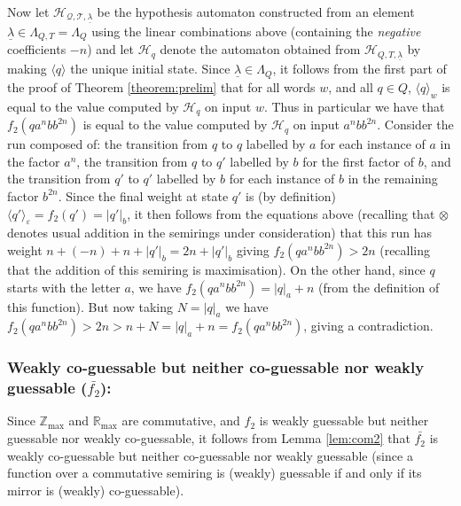 \documentclass[10pt,a4paper]{amsart}
\theoremstyle{definition}
\numberwithin{equation}{section}
\numberwithin{theorem}{section}
\begin{document}
         Now let $\mathcal{H_{Q,T, \underline{\lambda}}}$ be the hypothesis automaton constructed from an element $\underline{\lambda} \in \Lambda_{Q, T} = \Lambda_Q$ using the linear combinations above (containing the \emph{negative} coefficients $-n$) and let $\mathcal{H}_q$ denote the automaton obtained from $\mathcal{H}_{Q, T, \underline{\lambda}}$ by making $\langle q \rangle$ the unique initial state. Since $\underline{\lambda} \in \Lambda_Q$, it follows from the first part of the proof of Theorem \ref{theorem:prelim} that for all words $w$, and all $q \in Q$, $\langle q \rangle_w$ is equal to the value computed by $\mathcal{H}_q$ on input $w$. Thus in particular we have that $f_2(qa^nbb^{2n})$ is equal to the value computed by $\mathcal{H}_q$ on input $a^nbb^{2n}$. Consider the run composed of: the transition from $q$ to $q$ labelled by $a$ for each instance of $a$ in the factor $a^n$, the transition from $q$ to $q'$ labelled by $b$ for the first factor of $b$, and the transition from $q'$ to $q'$ labelled by $b$  for each instance of $b$ in the remaining factor $b^{2n}$. Since the final weight at state $q'$ is (by definition) $\langle q' \rangle_\varepsilon = f_2(q') = |q'|_b$, it then follows from the equations above (recalling that $\otimes$ denotes usual addition in the semirings under consideration) that this run has weight $n+  (-n) +n + |q'|_b = 2n + |q'|_b $ giving $f_2(qa^nbb^{2n}) > 2n$ (recalling that the addition of this semiring is maximisation). On the other hand, since $q$ starts with the letter $a$, we have $f_2(qa^nbb^{2n}) = |q|_a + n$ (from the definition of this function). But now taking $N=|q|_a$ we have $f_2(qa^nbb^{2n}) > 2n> n + N = |q|_a + n = f_2(qa^nbb^{2n})$, giving a contradiction.
	\subsubsection*{\textbf{Weakly co-guessable but neither co-guessable nor weakly guessable ($\bar{f_2}$):}}
	Since $\mathbb{Z}_{\max}$ and $\mathbb{R}_{\max}$ are commutative, and $f_2$ is weakly guessable but neither guessable nor weakly co-guessable, it follows from Lemma \ref{lem:com2} that  $\bar{f_2}$ is weakly co-guessable but neither co-guessable nor weakly guessable (since a function over a commutative semiring is (weakly) guessable if and only if its mirror is (weakly) co-guessable).
	
\end{document}
